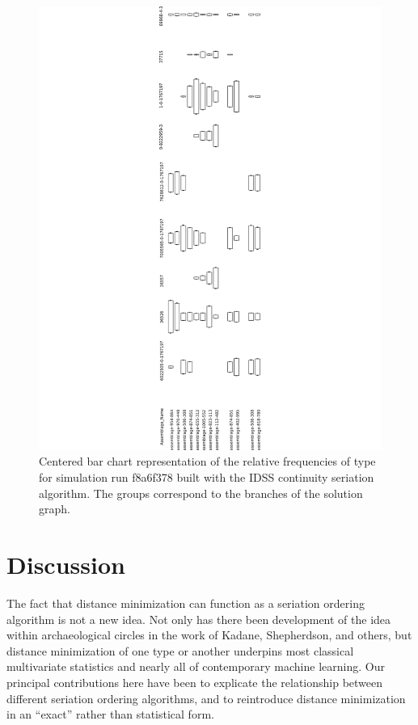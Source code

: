 \begin{figure}[ht]
\centering
\includegraphics[scale=0.5]{graphics/multipleseriation/continuity.pdf}
\caption{Centered bar chart representation of the relative frequencies of type for simulation run f8a6f378 built with the IDSS continuity seriation algorithm. The groups correspond to the branches of the solution graph.}
\label{img:continuity}
\end{figure}


\section{Discussion}\label{discussion}

The fact that distance minimization can function as a seriation ordering
algorithm is not a new idea. Not only has there been development of the
idea within archaeological circles in the work of Kadane, Shepherdson,
and others, but distance minimization of one type or another underpins
most classical multivariate statistics and nearly all of contemporary
machine learning. Our principal contributions here have been to
explicate the relationship between different seriation ordering
algorithms, and to reintroduce distance minimization in an ``exact''
rather than statistical form.

